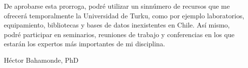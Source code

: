 \documentclass[9pt,stdletter,dateno,sigleft,openany]{newlfm} %
\begin{document}
\begin{newlfm}
De aprobarse esta prorroga, podr\'e utilizar un sinn\'umero de recursos que me ofrecer\'a temporalmente la Universidad de Turku, como por ejemplo laboratorios, equipamiento, bibliotecas y bases de datos inexistentes en Chile. As\'i mismo, podr\'e participar en seminarios, reuniones de trabajo y conferencias en los que estar\'an los expertos m\'as importantes de mi disciplina. 



{\vspace{1cm}\hspace{10cm}H\'ector Bahamonde, PhD}


\end{newlfm}
\end{document}
